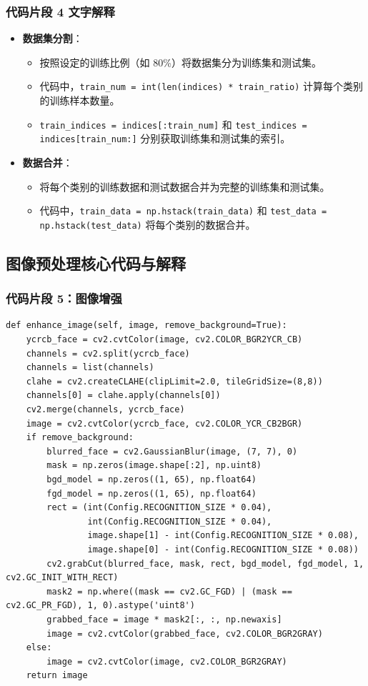 \documentclass{article}
\begin{document}
\subsubsection{代码片段 4 文字解释}
\begin{itemize}
    \item \textbf{数据集分割}：
    \begin{itemize}
        \item 按照设定的训练比例（如 80\%）将数据集分为训练集和测试集。
        \item 代码中，\texttt{train\_num = int(len(indices) * train\_ratio)} 计算每个类别的训练样本数量。
        \item \texttt{train\_indices = indices[:train\_num]} 和 \texttt{test\_indices = indices[train\_num:]} 分别获取训练集和测试集的索引。
    \end{itemize}
    \item \textbf{数据合并}：
    \begin{itemize}
        \item 将每个类别的训练数据和测试数据合并为完整的训练集和测试集。
        \item 代码中，\texttt{train\_data = np.hstack(train\_data)} 和 \texttt{test\_data = np.hstack(test\_data)} 将每个类别的数据合并。
    \end{itemize}
\end{itemize}

\subsection{图像预处理核心代码与解释}

\subsubsection{代码片段 5：图像增强}
\begin{lstlisting}[basicstyle=\scriptsize\ttfamily, linewidth=\textwidth]
def enhance_image(self, image, remove_background=True):
    ycrcb_face = cv2.cvtColor(image, cv2.COLOR_BGR2YCR_CB)
    channels = cv2.split(ycrcb_face)
    channels = list(channels)
    clahe = cv2.createCLAHE(clipLimit=2.0, tileGridSize=(8,8))
    channels[0] = clahe.apply(channels[0])
    cv2.merge(channels, ycrcb_face)
    image = cv2.cvtColor(ycrcb_face, cv2.COLOR_YCR_CB2BGR)
    if remove_background:
        blurred_face = cv2.GaussianBlur(image, (7, 7), 0)
        mask = np.zeros(image.shape[:2], np.uint8)
        bgd_model = np.zeros((1, 65), np.float64)
        fgd_model = np.zeros((1, 65), np.float64)
        rect = (int(Config.RECOGNITION_SIZE * 0.04),
                int(Config.RECOGNITION_SIZE * 0.04),
                image.shape[1] - int(Config.RECOGNITION_SIZE * 0.08),
                image.shape[0] - int(Config.RECOGNITION_SIZE * 0.08))
        cv2.grabCut(blurred_face, mask, rect, bgd_model, fgd_model, 1, cv2.GC_INIT_WITH_RECT)
        mask2 = np.where((mask == cv2.GC_FGD) | (mask == cv2.GC_PR_FGD), 1, 0).astype('uint8')
        grabbed_face = image * mask2[:, :, np.newaxis]
        image = cv2.cvtColor(grabbed_face, cv2.COLOR_BGR2GRAY)
    else:
        image = cv2.cvtColor(image, cv2.COLOR_BGR2GRAY)
    return image
\end{lstlisting}
\end{document}
